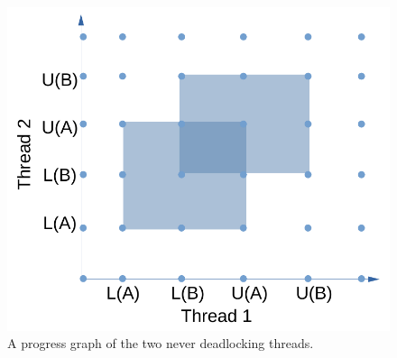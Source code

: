 \begin{figure}
  \centering
  \includegraphics[width=\textwidth]{img/progress-safe.pdf}
  \caption{A progress graph of the two never deadlocking threads.}
  \label{fig:progress-safe}
\end{figure}


